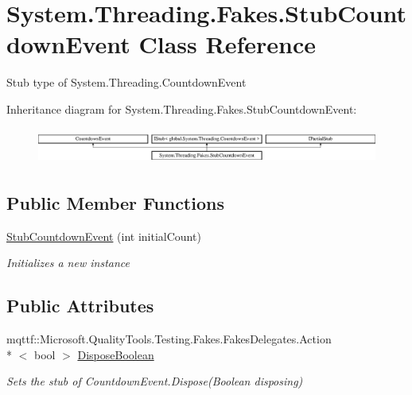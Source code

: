 \hypertarget{class_system_1_1_threading_1_1_fakes_1_1_stub_countdown_event}{\section{System.\-Threading.\-Fakes.\-Stub\-Countdown\-Event Class Reference}
\label{class_system_1_1_threading_1_1_fakes_1_1_stub_countdown_event}
}


Stub type of System.\-Threading.\-Countdown\-Event 


Inheritance diagram for System.\-Threading.\-Fakes.\-Stub\-Countdown\-Event\-:\begin{figure}[H]
\begin{center}
\leavevmode
\includegraphics[height=1.204301cm]{class_system_1_1_threading_1_1_fakes_1_1_stub_countdown_event}
\end{center}
\end{figure}
\subsection*{Public Member Functions}
\begin{DoxyCompactItemize}
\item 
\hyperlink{class_system_1_1_threading_1_1_fakes_1_1_stub_countdown_event_a5a241f739e8d00fc3e88e38387ec90fc}{Stub\-Countdown\-Event} (int initial\-Count)
\begin{DoxyCompactList}\small\item\em Initializes a new instance\end{DoxyCompactList}\end{DoxyCompactItemize}
\subsection*{Public Attributes}
\begin{DoxyCompactItemize}
\item 
mqttf\-::\-Microsoft.\-Quality\-Tools.\-Testing.\-Fakes.\-Fakes\-Delegates.\-Action\\*
$<$ bool $>$ \hyperlink{class_system_1_1_threading_1_1_fakes_1_1_stub_countdown_event_a0fdfa99fbae231ca8852f3abfb81b781}{Dispose\-Boolean}
\begin{DoxyCompactList}\small\item\em Sets the stub of Countdown\-Event.\-Dispose(\-Boolean disposing)\end{DoxyCompactList}\end{DoxyCompactItemize}
